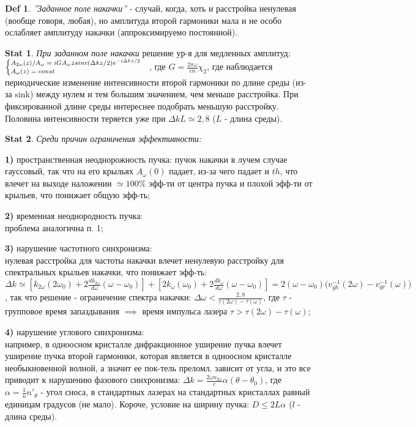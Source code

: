 \documentclass[a4paper,12pt]{article}
\theoremstyle{definition} %
\newtheorem{Stat}{Stat}[section]
\theoremstyle{definition} %
\newtheorem{Def}{Def}[section]
\theoremstyle{remark} %
\begin{document}
\begin{Def}\label{def \theDef}
	\textit{''Заданное поле накачки''} - случай, когда, хоть и расстройка ненулевая (вообще говоря, любая), но амплитуда второй гармоники мала и не особо ослабляет амплитуду накачки (аппроксимируемо постоянной).
\end{Def}
\begin{Stat}\label{stat \theStat}
	\textit{При заданном поле накачки} решение ур-я для медленных амплитуд: \\$\scriptsize
	\begin{cases}
		A_{2\omega}(z)/A_{\omega}=iGA_{\omega}z sinc(\Delta k z/2) e^{-i\Delta k z/2} \\
		A_{\omega}(z)=const
	\end{cases}$, где $G=\frac{2\pi \omega}{cn}\chi_{2}$, где наблюдается периодические изменение интенсивности второй гармоники по длине среды (из-за sink) между нулем и тем большим значением, чем меньше расстройка. При фиксированной длине среды интереснее подобрать меньшую расстройку. Половина интенсивности теряется уже при $\Delta k L \simeq 2,8$ ($L$ - длина среды).
\end{Stat}
\begin{Stat}\label{stat \theStat}
	\textit{Среди причин ограничения эффективности:}
	\par \textbf{1)} пространственная неоднорожность пучка:
	пучок накачки в лучем случае гауссовый, так что на его крыльях $A_{\omega}(0)$ падает, из-за чего падает и $th$, что влечет на выходе наложении $\simeq 100\%$ эфф-ти от центра пучка и плохой эфф-ти от крыльев, что понижает общую эфф-ть; \\
	\par \textbf{2)} временная неоднородность пучка: \\
	проблема аналогична п. 1; \\
	\par \textbf{3)} нарушение частотного синхронизма: \\
	нулевая расстройка для частоты накачки влечет ненулевую расстройку для спектральных крыльев накачки, что понижает эфф-ть: $\Delta k \simeq [k_{2\omega}(2\omega_{0})+2\frac{dk_{2\omega}}{d\omega}(\omega-\omega_{0})]+[2k_{\omega}(\omega_{0})+2\frac{dk_{\omega}}{d\omega}(\omega-\omega_{0})] = 2(\omega-\omega_{0}) \big( v_{gh}^{-1}(2\omega) - v_{gr}^{-1}(\omega) \big)$, так что решение - ограничение спектра накачки: $\Delta \omega < \frac{2,8}{\tau (2\omega) - \tau (\omega)}$, где $\tau$ - групповое время запаздывания $\implies$ время импульса лазера $\tau > \tau(2\omega)-\tau(\omega)$; \\ 
	\par \textbf{4)} нарушение углового синхронизма: \\
	например, в одноосном кристалле дифракционное уширение пучка влечет уширение пучка второй гармоники, которая является в одноосном кристалле необыкновенной волной, а значит ее пок-тель преломл. зависит от угла, и это все приводит к нарушению фазового синхронизма: $\Delta k = \frac{2\omega n_{2\omega}}{c}\alpha (\theta - \theta_{0})$, где $\alpha = \frac{1}{n}n'_{\theta}$ - угол сноса, в стандартных лазерах на стандартных кристаллах равный единицам градусов (не мало). Короче, условие на ширину пучка: $D \leq 2L \alpha$ ($l$ - длина среды).
\end{Stat}
\end{document}
